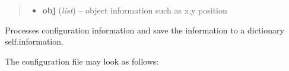 \documentclass[a4paper,11pt,english]{sphinxmanual}
\begin{document}
\begin{fulllineitems}
\begin{fulllineitems}
\begin{quote}
\begin{description}
\begin{itemize}
\item {} 
\textbf{obj} (\emph{list}) -- object information such as x,y position

\end{itemize}

\end{description}\end{quote}

\end{fulllineitems}


\begin{fulllineitems}
\label{simulator:simulator.simulator.VISsimulator.processConfigs}
Processes configuration information and save the information to a dictionary self.information.

The configuration file may look as follows:


\end{fulllineitems}
\end{fulllineitems}
\end{document}
